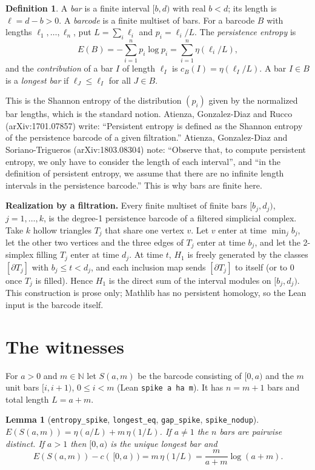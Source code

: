 \documentclass[11pt]{article}
\newtheorem{lemma}[theorem]{Lemma}
\theoremstyle{definition}
\newtheorem{definition}[theorem]{Definition}
\theoremstyle{remark}
\newcommand{\nml}{\eta}
\begin{document}
\begin{definition}
A \emph{bar} is a finite interval $[b,d)$ with real $b<d$; its length is $\ell=d-b>0$. A
\emph{barcode} is a finite multiset of bars. For a barcode $B$ with lengths $\ell_1,\dots,\ell_n$,
put $L=\sum_i\ell_i$ and $p_i=\ell_i/L$. The \emph{persistence entropy} is
\[
  E(B)=-\sum_{i=1}^n p_i\log p_i=\sum_{i=1}^n \nml(\ell_i/L),
\]
and the \emph{contribution} of a bar $I$ of length $\ell_I$ is $c_B(I)=\nml(\ell_I/L)$. A bar $I\in B$
is a \emph{longest bar} if $\ell_J\le\ell_I$ for all $J\in B$.
\end{definition}

This is the Shannon entropy of the distribution $(p_i)$ given by the normalized bar lengths, which is
the standard notion. Atienza, Gonzalez-Diaz and Rucco (arXiv:1701.07857) write: ``Persistent entropy
is defined as the Shannon entropy of the persistence barcode of a given filtration.'' Atienza,
Gonzalez-Diaz and Soriano-Trigueros (arXiv:1803.08304) note: ``Observe that, to compute persistent
entropy, we only have to consider the length of each interval'', and ``in the definition of
persistent entropy, we assume that there are no infinite length intervals in the persistence
barcode.'' This is why bars are finite here.

\textbf{Realization by a filtration.} Every finite multiset of finite bars $[b_j,d_j)$,
$j=1,\dots,k$, is the degree-1 persistence barcode of a filtered simplicial complex. Take $k$ hollow
triangles $T_j$ that share one vertex $v$. Let $v$ enter at time $\min_j b_j$, let the other two
vertices and the three edges of $T_j$ enter at time $b_j$, and let the 2-simplex filling $T_j$ enter
at time $d_j$. At time $t$, $H_1$ is freely generated by the classes $[\partial T_j]$ with
$b_j\le t<d_j$, and each inclusion map sends $[\partial T_j]$ to itself (or to $0$ once $T_j$ is
filled). Hence $H_1$ is the direct sum of the interval modules on $[b_j,d_j)$. This construction is
prose only; Mathlib has no persistent homology, so the Lean input is the barcode itself.

\section{The witnesses}

For $a>0$ and $m\in\mathbb{N}$ let $S(a,m)$ be the barcode consisting of $[0,a)$ and the $m$ unit bars
$[i,i+1)$, $0\le i<m$ (Lean \texttt{spike a ha m}). It has $n=m+1$ bars and total length $L=a+m$.

\begin{lemma}[\texttt{entropy\_spike}, \texttt{longest\_eq}, \texttt{gap\_spike}, \texttt{spike\_nodup}]
$E(S(a,m))=\nml(a/L)+m\,\nml(1/L)$. If $a\ne1$ the $n$ bars are pairwise distinct. If $a>1$ then
$[0,a)$ is the unique longest bar and
\[
  E(S(a,m))-c(\,[0,a)\,)=m\,\nml(1/L)=\frac{m}{a+m}\log(a+m).
\]
\end{lemma}
\end{document}
